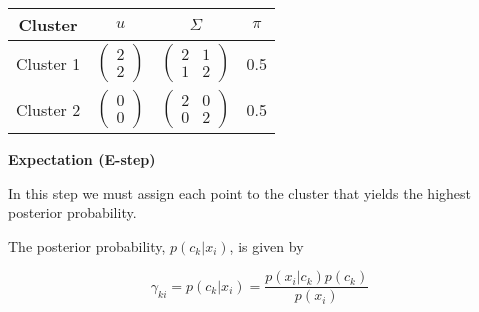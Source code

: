 \documentclass[12pt]{article}
\begin{document}
\begin{enumerate}[leftmargin=\labelsep]
          \begin{center}
              \captionsetup{type=table}
              \begin{tabular}{c|ccc}
                  Cluster                       & $u$ & $\varSigma$ & $\pi$ \\
                  \hline
                  \colorbox{bgreen}{Cluster 1}  &
                  $\begin{pmatrix}
                           2 \\
                           2
                       \end{pmatrix}$              &
                  $\begin{pmatrix}
                           2 & 1 \\
                           1 & 2
                       \end{pmatrix}$              &
                  0.5                                                       \\
                  \colorbox{byellow}{Cluster 2} &
                  $\begin{pmatrix}
                           0 \\
                           0
                       \end{pmatrix}$              &
                  $\begin{pmatrix}
                           2 & 0 \\
                           0 & 2
                       \end{pmatrix}$              &
                  0.5                                                       \\
              \end{tabular}
              \label{ex1-phi-table}
          \end{center}

          \textbf{Expectation (E-step)}

          In this step we must assign each point to the cluster that yields
          the highest posterior probability.

          The posterior probability, $p(c_k | x_i)$, is given by

          \begin{equation}\label{ex1-posterior}
              \gamma_{ki} = p(c_k | x_i) = \frac{p(x_i|c_k)p(c_k)}{p(x_i)}
          \end{equation}


\end{enumerate}
\end{document}
